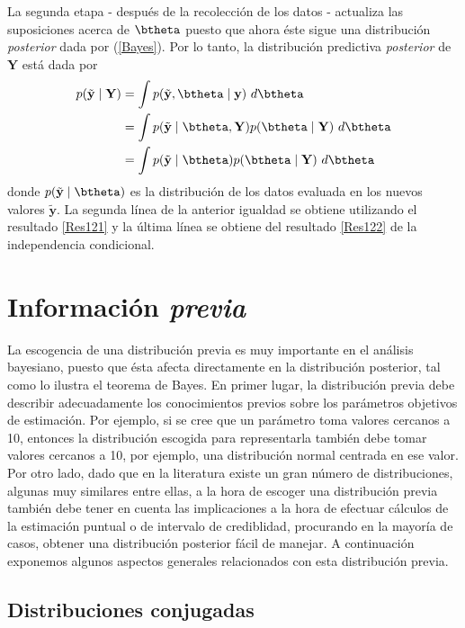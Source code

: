 \documentclass[10pt,openright]{book}\usepackage[]{graphicx}\usepackage[]{color}
\begin{document}
La segunda etapa - después de la recolección de los datos - actualiza las suposiciones acerca de $\btheta$ puesto que ahora éste sigue una distribución \emph{posterior} dada por (\ref{Bayes}). Por lo tanto, la distribución predictiva  \emph{posterior} de $\mathbf{Y}$ está dada por
\begin{align}\label{predictpos}
p(\tilde{\mathbf{y}} \mid \mathbf{Y})&=\int p(\tilde{\mathbf{y}},\btheta \mid \mathbf{y})\ d\btheta \notag \\
&=\int p(\tilde{\mathbf{y}} \mid \btheta,\mathbf{Y})p(\btheta \mid \mathbf{Y})\ d\btheta \notag \\
&=\int p(\tilde{\mathbf{y}} \mid \btheta)p(\btheta \mid \mathbf{Y})\ d\btheta
\end{align}
donde $p(\tilde{\mathbf{y}} \mid \btheta)$ es la distribución de los datos evaluada en los nuevos valores $\tilde{\mathbf{y}}$. La segunda línea de la anterior igualdad se obtiene utilizando el resultado \ref{Res121}  y la última línea se obtiene del resultado \ref{Res122} de la independencia condicional.

\section{Información \emph{previa}}

La escogencia de una distribución previa es muy importante en el análisis bayesiano, puesto que ésta afecta directamente en la distribución posterior, tal como lo ilustra el teorema de Bayes. En primer lugar, la distribución previa debe describir adecuadamente los conocimientos previos sobre los parámetros objetivos de estimación. Por ejemplo, si se cree que un parámetro toma valores cercanos a 10, entonces la distribución escogida para representarla también debe tomar valores cercanos a 10, por ejemplo, una distribución normal centrada en ese valor. Por otro lado, dado que en la literatura existe un gran número de distribuciones, algunas muy similares entre ellas, a la hora de escoger una distribución previa también debe tener en cuenta las implicaciones a la hora de efectuar cálculos de la estimación puntual o de intervalo de crediblidad, procurando en la mayoría de casos, obtener una distribución posterior fácil de manejar. A continuación exponemos algunos aspectos generales relacionados con esta distribución previa.

\subsection{Distribuciones conjugadas}
\end{document}
